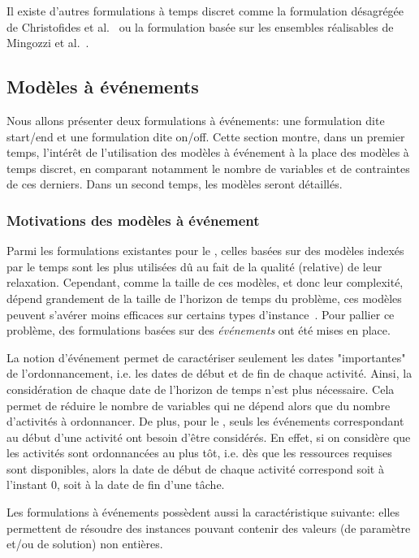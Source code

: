Il existe d'autres formulations à temps discret comme la formulation
désagrégée de Christofides et al.~\cite{CAVT} ou la formulation basée
sur les ensembles réalisables de Mingozzi et al.~\cite{MMRB}.

\subsection{Modèles à événements}
\label{sec:event_RCPSP}

Nous allons présenter deux formulations à événements: une formulation
dite start/end et une formulation dite on/off.  Cette section montre,
dans un premier temps, l'intérêt de l'utilisation des modèles à
événement à la place des modèles à temps discret, en comparant
notamment le nombre de variables et de contraintes de ces derniers.
Dans un second temps, les modèles seront détaillés.

\subsubsection{Motivations des modèles à événement}

Parmi les formulations existantes pour le \RCPSP, celles basées sur des
modèles indexés par le temps sont les plus utilisées dû au fait de la
qualité (relative) de leur relaxation.  Cependant, comme la taille de
ces modèles, et donc leur complexité, dépend grandement de la taille
de l'horizon de temps du problème, ces modèles peuvent s’avérer moins
efficaces sur certains types d'instance~\cite{modele_RCPSP}. Pour
pallier ce problème, des formulations basées sur des {\it événements}
ont été mises en place.

La notion d'événement permet de caractériser seulement les dates
"importantes" de l'ordonnancement, i.e. les dates de début et de
fin de chaque activité. Ainsi, la considération de chaque date de
l'horizon de temps n'est plus nécessaire. Cela permet de réduire
le nombre de variables qui ne dépend alors que du nombre
d'activités à ordonnancer. De plus, pour le \RCPSP, seuls les
événements correspondant au début d'une activité ont besoin d'être
considérés. En effet, si on considère que les activités sont
ordonnancées au plus tôt, i.e. dès que les ressources requises sont
disponibles, alors la date de début de chaque activité correspond soit
à l'instant $0$, soit à la date de fin d'une tâche.

Les formulations à événements possèdent aussi la caractéristique
suivante: elles permettent de résoudre des instances pouvant
contenir des valeurs (de paramètre et/ou de solution) non
entières.

